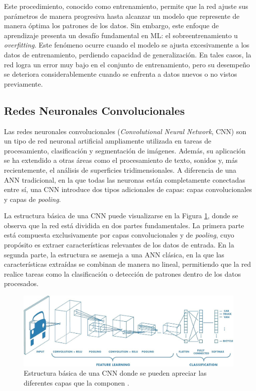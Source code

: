 Este procedimiento, conocido como entrenamiento, permite que la red ajuste sus parámetros de manera progresiva hasta alcanzar un modelo que represente de manera óptima los patrones de los datos. Sin embargo, este enfoque de aprendizaje presenta un desafío fundamental en ML: el sobreentrenamiento u \textit{overfitting}. Este fenómeno ocurre cuando el modelo se ajusta excesivamente a los datos de entrenamiento, perdiendo capacidad de generalización. En tales casos, la red logra un error muy bajo en el conjunto de entrenamiento, pero su desempeño se deteriora considerablemente cuando se enfrenta a datos nuevos o no vistos previamente.

\subsection{Redes Neuronales Convolucionales}
\label{cnnDescription}
Las redes neuronales convolucionales (\textit{Convolutional Neural Network}, CNN) \cite{lecun_backpropagation_1989, leCUM_CNN} son un tipo de red neuronal artificial ampliamente utilizada en tareas de procesamiento, clasificación y segmentación de imágenes. Además, su aplicación se ha extendido a otras áreas como el procesamiento de texto, sonidos y, más recientemente, el análisis de superficies tridimensionales. A diferencia de una ANN tradicional, en la que todas las neuronas están completamente conectadas entre sí, una CNN introduce dos tipos adicionales de capas: capas convolucionales y capas de \textit{pooling}.

La estructura básica de una CNN puede visualizarse en la Figura \ref{fig:cnnExample}, donde se observa que la red está dividida en dos partes fundamentales. La primera parte está compuesta exclusivamente por capas convolucionales y de \textit{pooling}, cuyo propósito es extraer características relevantes de los datos de entrada. En la segunda parte, la estructura se asemeja a una ANN clásica, en la que las características extraídas se combinan de manera no lineal, permitiendo que la red realice tareas como la clasificación o detección de patrones dentro de los datos procesados.

\begin{figure}[h]
    \centering
    \includegraphics[width=\linewidth]{figures/2_theory/cnnExample.jpeg}
    \caption[Estructura básica de una red neuronal convolucional]{Estructura básica de una CNN donde se pueden apreciar las diferentes capas que la componen \cite{prabhu_understanding_2019}.}
    \label{fig:cnnExample}
\end{figure}

